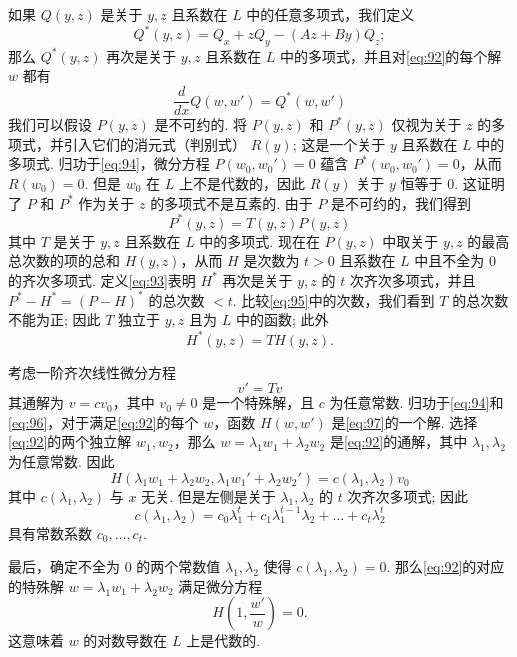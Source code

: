 如果 $Q(y,z)$ 是关于 $y,z$ 且系数在 $L$ 中的任意多项式，我们定义
\begin{equation}
Q^*(y,z) = Q_x + zQ_y - (Az+By)Q_z; \tag{93}\label{eq:93}
\end{equation}
那么 $Q^*(y,z)$ 再次是关于 $y,z$ 且系数在 $L$ 中的多项式，并且对\eqref{eq:92}的每个解 $w$ 都有
\begin{equation}
\frac{d}{dx} Q(w,w') = Q^*(w,w') \tag{94}\label{eq:94}
\end{equation}
我们可以假设 $P(y,z)$ 是不可约的. 将 $P(y,z)$ 和 $P^*(y,z)$ 仅视为关于 $z$ 的多项式，并引入它们的消元式（判别式） $R(y)$; 这是一个关于 $y$ 且系数在 $L$ 中的多项式. 归功于\eqref{eq:94}，微分方程 $P(w_0,w_0')=0$ 蕴含 $P^*(w_0,w_0')=0$，从而 $R(w_0)=0$. 但是 $w_0$ 在 $L$ 上不是代数的，因此 $R(y)$ 关于 $y$ 恒等于 0. 这证明了 $P$ 和 $P^*$ 作为关于 $z$ 的多项式不是互素的. 由于 $P$ 是不可约的，我们得到
\begin{equation}
P^*(y,z) = T(y,z) P(y,z) \tag{95}\label{eq:95}
\end{equation}
其中 $T$ 是关于 $y,z$ 且系数在 $L$ 中的多项式. 现在在 $P(y,z)$ 中取关于 $y,z$ 的最高总次数的项的总和 $H(y,z)$，从而 $H$ 是次数为 $t > 0$ 且系数在 $L$ 中且不全为 0 的齐次多项式. 定义\eqref{eq:93}表明 $H^*$ 再次是关于 $y,z$ 的 $t$ 次齐次多项式，并且 $P^*-H^*=(P-H)^*$ 的总次数 $< t$. 比较\eqref{eq:95}中的次数，我们看到 $T$ 的总次数不能为正; 因此 $T$ 独立于 $y,z$ 且为 $L$ 中的函数; 此外
\begin{equation}
H^*(y,z) = T H(y,z). \tag{96}\label{eq:96}
\end{equation}

考虑一阶齐次线性微分方程
\begin{equation}
v' = Tv \tag{97}\label{eq:97}
\end{equation}
其通解为 $v = c v_0$，其中 $v_0 \neq 0$ 是一个特殊解，且 $c$ 为任意常数. 归功于\eqref{eq:94}和\eqref{eq:96}，对于满足\eqref{eq:92}的每个 $w$，函数 $H(w,w')$ 是\eqref{eq:97}的一个解. 选择\eqref{eq:92}的两个独立解 $w_1, w_2$，那么 $w= \lambda_1 w_1 + \lambda_2 w_2$ 是\eqref{eq:92}的通解，其中 $\lambda_1, \lambda_2$ 为任意常数. 因此
\[H(\lambda_1 w_1 + \lambda_2 w_2, \lambda_1 w_1' + \lambda_2 w_2') = c(\lambda_1, \lambda_2) v_0\]
其中 $c(\lambda_1, \lambda_2)$ 与 $x$ 无关. 但是左侧是关于 $\lambda_1, \lambda_2$ 的 $t$ 次齐次多项式; 因此
\[c(\lambda_1, \lambda_2) = c_0 \lambda_1^{t} + c_1 \lambda_1^{t-1} \lambda_2 + \dots + c_t \lambda_2^{t}\]
具有常数系数 $c_0, \dots, c_t$.

最后，确定不全为 0 的两个常数值 $\lambda_1, \lambda_2$ 使得 $c(\lambda_1, \lambda_2)=0$. 那么\eqref{eq:92}的对应的特殊解 $w=\lambda_1 w_1 + \lambda_2 w_2$ 满足微分方程
\[H\left(1,\frac{w'}{w}\right) = 0.\]
这意味着 $w$ 的对数导数在 $L$ 上是代数的.

